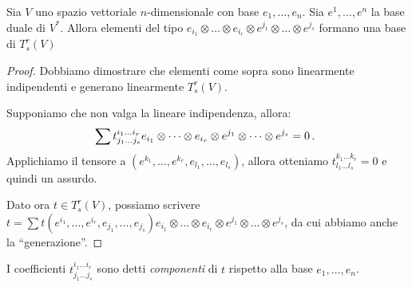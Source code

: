 \begin{proposition}
	Sia $V$ uno spazio vettoriale $n$-dimensionale con base $e_1,\dots,e_n$. Sia $e^1,\dots,e^n$ la base duale di $V^*$. Allora elementi del tipo $e_{i_1}\otimes \dots \otimes e_{i_r}\otimes e^{j_1}\otimes \dots \otimes e^{j_s}$ formano una base di $T_s^r(V)$
\end{proposition}
\begin{proof}
	Dobbiamo dimostrare che elementi come sopra sono linearmente indipendenti e generano linearmente $T_s^r(V)$.
	
	Supponiamo che non valga la lineare indipendenza, allora:
	\begin{equation*}
		\sum t_{j_1\dots j_s}^{i_1\dots i_r} e_{i_1}\otimes \dots \otimes e_{i_r}\otimes e^{j_1}\otimes \dots \otimes e^{j_s} = 0\, \text{. }
	\end{equation*}
	Applichiamo il tensore a $(e^{k_1},\dots,e^{k_r},e_{l_1},\dots,e_{l_s})$, allora otteniamo $t_{l_1\dots l_s}^{k_1 \dots k_r} = 0$ e quindi un assurdo.
	
	Dato ora $t\in T_s^r(V)$, possiamo scrivere $t = \sum t(e^{i_1},\dots, e^{i_r},e_{j_1},\dots, e_{j_s})e_{i_1}\otimes \dots \otimes e_{i_r}\otimes e^{j_1}\otimes \dots \otimes e^{j_s}$, da cui abbiamo anche la ``generazione''.
\end{proof}

\begin{definition}
	I coefficienti $t_{j_1\dots j_s}^{i_1\dots i_r}$ sono detti \emph{componenti} di $t$ rispetto alla base $e_1,\dots,e_n$.
\end{definition}

